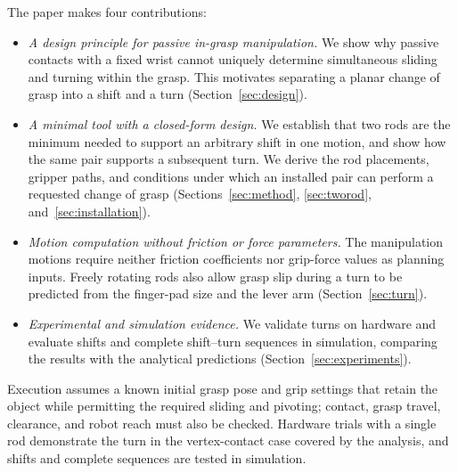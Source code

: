 The paper makes four contributions:
\begin{itemize}
    \item \emph{A design principle for passive in-grasp manipulation.} We show why passive contacts with a fixed wrist cannot uniquely determine simultaneous sliding and turning within the grasp. This motivates separating a planar change of grasp into a shift and a turn (Section~\ref{sec:design}).
    \item \emph{A minimal tool with a closed-form design.} We establish that two rods are the minimum needed to support an arbitrary shift in one motion, and show how the same pair supports a subsequent turn. We derive the rod placements, gripper paths, and conditions under which an installed pair can perform a requested change of grasp (Sections~\ref{sec:method}, \ref{sec:tworod}, and~\ref{sec:installation}).
    \item \emph{Motion computation without friction or force parameters.} The manipulation motions require neither friction coefficients nor grip-force values as planning inputs. Freely rotating rods also allow grasp slip during a turn to be predicted from the finger-pad size and the lever arm (Section~\ref{sec:turn}).
    \item \emph{Experimental and simulation evidence.} We validate turns on hardware and evaluate shifts and complete shift--turn sequences in simulation, comparing the results with the analytical predictions (Section~\ref{sec:experiments}).
\end{itemize}

Execution assumes a known initial grasp pose and grip settings that retain the object while permitting the required sliding and pivoting; contact, grasp travel, clearance, and robot reach must also be checked. Hardware trials with a single rod demonstrate the turn in the vertex-contact case covered by the analysis, and shifts and complete sequences are tested in simulation.


